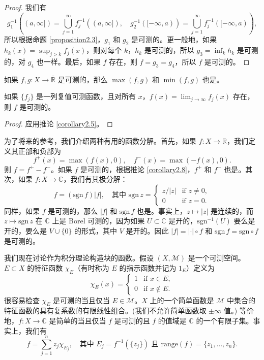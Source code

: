 \documentclass[lang=cn,10pt,thmcnt=section]{elegantbook}
\begin{document}
\begin{proof}
我们有
\[ g_1^{-1}((a, \infty]) = \bigcup_{j=1}^{\infty} f_j^{-1}((a, \infty]), \quad g_2^{-1}([-\infty, a)) = \bigcup_{j=1}^{\infty} f_j^{-1}([-\infty, a)), \]
所以根据命题 \ref{proposition2.3}，$g_1$ 和 $g_2$ 是可测的。更一般地，如果 $h_k(x) = \sup_{j>k} f_j(x)$，则对每个 $k$，$h_k$ 是可测的，所以 $g_3 = \inf_k h_k$ 是可测的，对 $g_4$ 也一样。最后，如果 $f$ 存在，则 $f = g_3 = g_4$，所以 $f$ 是可测的。
\end{proof}

\begin{corollary}\label{corollary2.8}
如果 $f, g : X \to \overline{\mathbb{R}}$ 是可测的，那么 $\max(f,g)$ 和 $\min(f,g)$ 也是。
\end{corollary}

\begin{corollary}\label{corollary2.9}
如果 $\{f_j\}$ 是一列复值可测函数，且对所有 $x$，$f(x) = \lim_{j\to\infty} f_j(x)$ 存在，则 $f$ 是可测的。
\end{corollary}

\begin{proof}
应用推论 \ref{corollary2.5}。
\end{proof}

为了将来的参考，我们介绍两种有用的函数分解。首先，如果 $f : X \to \mathbb{R}$，我们定义其正部和负部为
\[ f^+(x) = \max(f(x), 0), \quad f^-(x) = \max(-f(x), 0). \]
则 $f = f^+ - f^-$。如果 $f$ 是可测的，根据推论 \ref{corollary2.8}，$f^+$ 和 $f^-$ 也是。其次，如果 $f : X \to \mathbb{C}$，我们有其极分解：
\[ f = (\mathrm{sgn}\,f)|f|, \quad \text{其中 } \mathrm{sgn}\,z = \begin{cases} z/|z| & \text{if } z \neq 0, \\ 0 & \text{if } z = 0. \end{cases} \]
同样，如果 $f$ 是可测的，那么 $|f|$ 和 $\mathrm{sgn}\,f$ 也是。事实上，$z \mapsto |z|$ 是连续的，而 $z \mapsto \mathrm{sgn}\,z$ 在 $\mathbb{C}$ 上是 Borel 可测的，因为如果 $U \subset \mathbb{C}$ 是开的，$\mathrm{sgn}^{-1}(U)$ 要么是开的，要么是 $V \cup \{0\}$ 的形式，其中 $V$ 是开的。因此 $|f| = |\cdot| \circ f$ 和 $\mathrm{sgn}\,f = \mathrm{sgn} \circ f$ 是可测的。

我们现在讨论作为积分理论构造块的函数。假设 $(X, \mathcal{M})$ 是一个可测空间。$E \subset X$ 的特征函数 $\chi_E$（有时称为 $E$ 的指示函数并记为 $1_E$）定义为
\[ \chi_E(x) = \begin{cases} 1 & \text{if } x \in E, \\ 0 & \text{if } x \notin E. \end{cases} \]
很容易检查 $\chi_E$ 是可测的当且仅当 $E \in \mathcal{M}$。$X$ 上的一个简单函数是 $\mathcal{M}$ 中集合的特征函数的具有复系数的有限线性组合。(我们不允许简单函数取 $\pm\infty$ 值。) 等价地，$f : X \to \mathbb{C}$ 是简单的当且仅当 $f$ 是可测的且 $f$ 的值域是 $\mathbb{C}$ 的一个有限子集。事实上，我们有
\[ f = \sum_{j=1}^{n} z_j \chi_{E_j}, \quad \text{其中 } E_j = f^{-1}(\{z_j\}) \text{ 且 } \mathrm{range}(f) = \{z_1, \dots, z_n\}. \]
\end{document}
